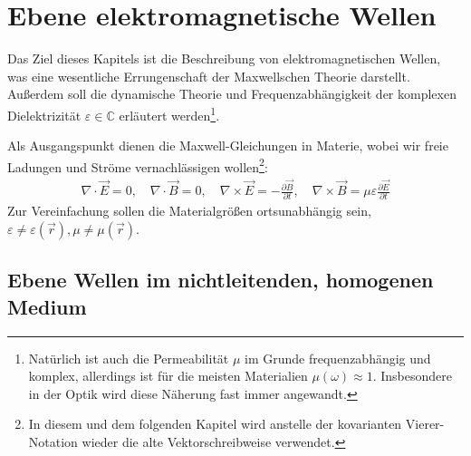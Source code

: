 


\chapter{Ebene elektromagnetische Wellen}


Das Ziel dieses Kapitels ist die Beschreibung von elektromagnetischen Wellen, was eine wesentliche Errungenschaft der Maxwellschen Theorie darstellt.
Außerdem soll die dynamische Theorie und Frequenzabhängigkeit der komplexen Dielektrizität $\varepsilon\in\mathbb{C}$ erläutert werden\footnote{Natürlich ist auch die Permeabilität $\mu$ im Grunde frequenzabhängig und komplex, allerdings ist für die meisten Materialien $\mu(\omega)\approx 1$. Insbesondere in der Optik wird diese Näherung fast immer angewandt. }.

Als Ausgangspunkt dienen die Maxwell-Gleichungen in Materie, wobei wir freie Ladungen und Ströme vernachlässigen wollen\footnote{In diesem und dem folgenden Kapitel wird anstelle der kovarianten Vierer-Notation wieder die alte Vektorschreibweise verwendet.}:
\begin{align}
    \nabla\cdot\vec E=0,\quad \nabla\cdot\vec B=0, \quad \nabla\times \vec E=-\frac{\partial\vec B}{\partial t}, \quad \nabla\times \vec B=\mu\varepsilon \frac{\partial\vec E}{\partial t}
\end{align}
Zur Vereinfachung sollen die Materialgrößen ortsunabhängig sein, $\varepsilon\neq\varepsilon(\vec r),\mu\neq\mu(\vec r)$.




\section{Ebene Wellen im nichtleitenden, homogenen Medium}

